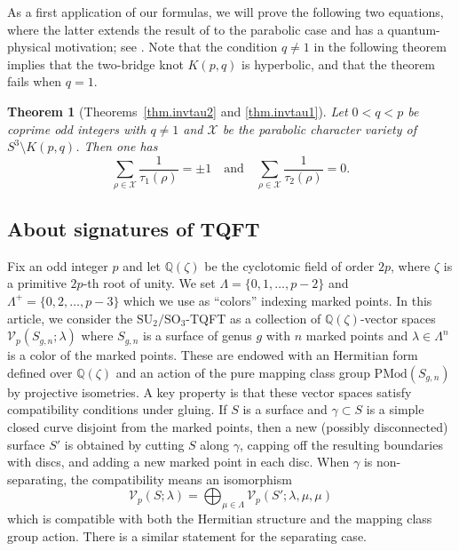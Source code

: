 \documentclass{amsart}
\newcommand{\Q}{\mathbb{Q}}
\newcommand{\calV}{\mathcal{V}}
\newcommand{\calX}{\mathcal{X}}
\newcommand{\PMod}{\mathrm{PMod}}
\newcommand{\SU}{\mathrm{SU}}
\newcommand{\SO}{\mathrm{SO}}
\newtheorem{theoremA}{Theorem}
\theoremstyle{definition}
\begin{document}
As a first application of our formulas, we will prove the following two equations, where the latter extends the result of \cite{Yoon} to the parabolic case and has a quantum-physical motivation; see \cite{GKY}. 
Note that the condition $q \neq 1$ in the following theorem implies that the two-bridge knot $K(p,q)$ is hyperbolic, and that the theorem fails when $q=1$.

\begin{theoremA}[Theorems~\ref{thm.invtau2} and \ref{thm.invtau1}]
Let $0<q<p$ be coprime odd integers with $q\neq1$ and $\calX$ be the parabolic character variety of $S^3\setminus K(p,q)$. Then one has 
$$\sum_{\rho\in \calX}\frac{1}{\tau_1(\rho)}=\pm 1 \quad \text{and} \quad  \sum_{\rho\in \calX}\frac{1}{\tau_2(\rho)}=0.$$
\end{theoremA}


\subsection{About signatures of TQFT}

Fix an odd integer $p$ and let $\Q(\zeta)$ be the cyclotomic field of order $2p$, where $\zeta$ is a primitive $2p$-th root of unity. We set $\Lambda=\{0,1,\ldots,p-2\}$ and $\Lambda^+=\{0,2,\ldots,p-3\}$ which we use as ``colors'' indexing marked points. In this article, we consider the $\SU_2/\SO_3$-TQFT as a collection of $\Q(\zeta)$-vector spaces $\calV_p(S_{g,n};\lambda)$ where $S_{g,n}$ is a surface of genus $g$ with $n$ marked points and $\lambda\in \Lambda^n$ is a color of the marked points. These are endowed with an Hermitian form defined over $\Q(\zeta)$ and an action of the pure mapping class group $\PMod(S_{g,n})$ by projective isometries. 
A key property is that these vector spaces satisfy compatibility conditions under gluing. If $S$ is a surface and $\gamma\subset S$ is a simple closed curve disjoint from the marked points, then a new (possibly disconnected) surface $S'$ is obtained by cutting $S$ along $\gamma$, capping off the resulting boundaries with discs, and adding a new marked point in each disc. When $\gamma$ is non-separating, the compatibility means an isomorphism 
$$\calV_p(S;\lambda)=\bigoplus_{\mu\in \Lambda} \calV_p(S';\lambda,\mu,\mu)$$
which is compatible with both the Hermitian structure and the mapping class group action. There is a similar statement for the separating case. 
\end{document}
